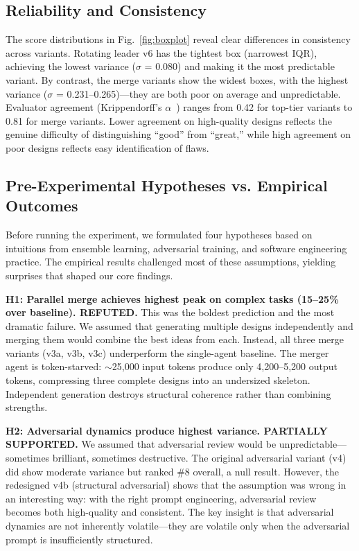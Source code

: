 \documentclass[conference]{IEEEtran}
\begin{document}
\subsection{Reliability and Consistency}

The score distributions in Fig.~\ref{fig:boxplot} reveal clear differences in consistency across variants. Rotating leader v6 has the tightest box (narrowest IQR), achieving the lowest variance ($\sigma$ = 0.080) and making it the most predictable variant. By contrast, the merge variants show the widest boxes, with the highest variance ($\sigma$ = 0.231--0.265)---they are both poor on average and unpredictable. Evaluator agreement (Krippendorff's $\alpha$~\cite{krippendorff}) ranges from 0.42 for top-tier variants to 0.81 for merge variants. Lower agreement on high-quality designs reflects the genuine difficulty of distinguishing ``good'' from ``great,'' while high agreement on poor designs reflects easy identification of flaws.

\subsection{Pre-Experimental Hypotheses vs. Empirical Outcomes}

Before running the experiment, we formulated four hypotheses based on intuitions from ensemble learning, adversarial training, and software engineering practice. The empirical results challenged most of these assumptions, yielding surprises that shaped our core findings.

\textbf{H1: Parallel merge achieves highest peak on complex tasks (15--25\% over baseline). REFUTED.} This was the boldest prediction and the most dramatic failure. We assumed that generating multiple designs independently and merging them would combine the best ideas from each. Instead, all three merge variants (v3a, v3b, v3c) underperform the single-agent baseline. The merger agent is token-starved: $\sim$25,000 input tokens produce only 4,200--5,200 output tokens, compressing three complete designs into an undersized skeleton. Independent generation destroys structural coherence rather than combining strengths.

\textbf{H2: Adversarial dynamics produce highest variance. PARTIALLY SUPPORTED.} We assumed that adversarial review would be unpredictable---sometimes brilliant, sometimes destructive. The original adversarial variant (v4) did show moderate variance but ranked \#8 overall, a null result. However, the redesigned v4b (structural adversarial) shows that the assumption was wrong in an interesting way: with the right prompt engineering, adversarial review becomes both high-quality and consistent. The key insight is that adversarial dynamics are not inherently volatile---they are volatile only when the adversarial prompt is insufficiently structured.
\end{document}
